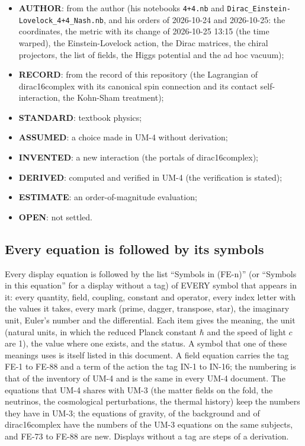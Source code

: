 \documentclass[
  10pt,
]{article}
\providecommand{\tightlist}{%
  \setlength{\itemsep}{0pt}\setlength{\parskip}{0pt}}
\begin{document}
\begin{itemize}
\tightlist
\item
  \textbf{AUTHOR}: from the author (his notebooks \texttt{4+4.nb} and
  \texttt{Dirac\_Einstein-Lovelock\_4+4\_Nash.nb}, and his orders of
  2026-10-24 and 2026-10-25: the coordinates, the metric with its change
  of 2026-10-25 13:15 (the time warped), the Einstein-Lovelock action,
  the Dirac matrices, the chiral projectors, the list of fields, the
  Higgs potential and the ad hoc vacuum);
\item
  \textbf{RECORD}: from the record of this repository (the Lagrangian of
  dirac16complex with its canonical spin connection and its contact
  self-interaction, the Kohn-Sham treatment);
\item
  \textbf{STANDARD}: textbook physics;
\item
  \textbf{ASSUMED}: a choice made in UM-4 without derivation;
\item
  \textbf{INVENTED}: a new interaction (the portals of dirac16complex);
\item
  \textbf{DERIVED}: computed and verified in UM-4 (the verification is
  stated);
\item
  \textbf{ESTIMATE}: an order-of-magnitude evaluation;
\item
  \textbf{OPEN}: not settled.
\end{itemize}

\hypertarget{every-equation-is-followed-by-its-symbols}{%
\subsection{Every equation is followed by its
symbols}\label{every-equation-is-followed-by-its-symbols}}

Every display equation is followed by the list ``Symbols in (FE-n)'' (or
``Symbols in this equation'' for a display without a tag) of EVERY
symbol that appears in it: every quantity, field, coupling, constant and
operator, every index letter with the values it takes, every mark
(prime, dagger, transpose, star), the imaginary unit, Euler's number and
the differential. Each item gives the meaning, the unit (natural units,
in which the reduced Planck constant \(\hbar\) and the speed of light
\(c\) are 1), the value where one exists, and the status. A symbol that
one of these meanings uses is itself listed in this document. A field
equation carries the tag FE-1 to FE-88 and a term of the action the tag
IN-1 to IN-16; the numbering is that of the inventory of UM-4 and is the
same in every UM-4 document. The equations that UM-4 shares with UM-3
(the matter fields on the fold, the neutrinos, the cosmological
perturbations, the thermal history) keep the numbers they have in UM-3;
the equations of gravity, of the background and of dirac16complex have
the numbers of the UM-3 equations on the same subjects, and FE-73 to
FE-88 are new. Displays without a tag are steps of a derivation.
\end{document}
